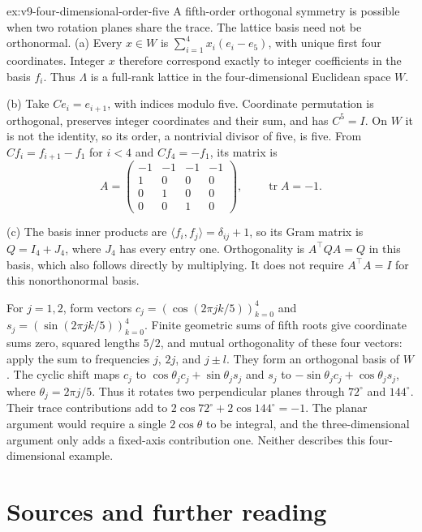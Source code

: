 \begin{solution}{ex:v9-four-dimensional-order-five}
\idea A fifth-order orthogonal symmetry is possible when two rotation planes share the trace. The lattice basis need not be orthonormal.
\writeup (a) Every $x\in W$ is $\sum_{i=1}^4x_i(e_i-e_5)$, with unique first four coordinates. Integer $x$ therefore correspond exactly to integer coefficients in the basis $f_i$. Thus $\Lambda$ is a full-rank lattice in the four-dimensional Euclidean space $W$.

(b) Take $Ce_i=e_{i+1}$, with indices modulo five. Coordinate permutation is orthogonal, preserves integer coordinates and their sum, and has $C^5=I$. On $W$ it is not the identity, so its order, a nontrivial divisor of five, is five. From $Cf_i=f_{i+1}-f_1$ for $i<4$ and $Cf_4=-f_1$, its matrix is
\[
A=\begin{pmatrix}-1&-1&-1&-1\\1&0&0&0\\0&1&0&0\\0&0&1&0\end{pmatrix},
\qquad\operatorname{tr}A=-1.
\]

(c) The basis inner products are $\langle f_i,f_j\rangle=\delta_{ij}+1$, so its Gram matrix is $Q=I_4+J_4$, where $J_4$ has every entry one. Orthogonality is $A^\top QA=Q$ in this basis, which also follows directly by multiplying. It does not require $A^\top A=I$ for this nonorthonormal basis.

For $j=1,2$, form vectors $c_j=(\cos(2\pi jk/5))_{k=0}^4$ and $s_j=(\sin(2\pi jk/5))_{k=0}^4$. Finite geometric sums of fifth roots give coordinate sums zero, squared lengths $5/2$, and mutual orthogonality of these four vectors: apply the sum to frequencies $j$, $2j$, and $j\pm l$. They form an orthogonal basis of $W$. The cyclic shift maps $c_j$ to $\cos\theta_j c_j+\sin\theta_j s_j$ and $s_j$ to $-\sin\theta_j c_j+\cos\theta_j s_j$, where $\theta_j=2\pi j/5$. Thus it rotates two perpendicular planes through $72^\circ$ and $144^\circ$. Their trace contributions add to
$2\cos72^\circ+2\cos144^\circ=-1$. The planar argument would require a single $2\cos\theta$ to be integral, and the three-dimensional argument only adds a fixed-axis contribution one. Neither describes this four-dimensional example.
\end{solution}

\section*{Sources and further reading}

